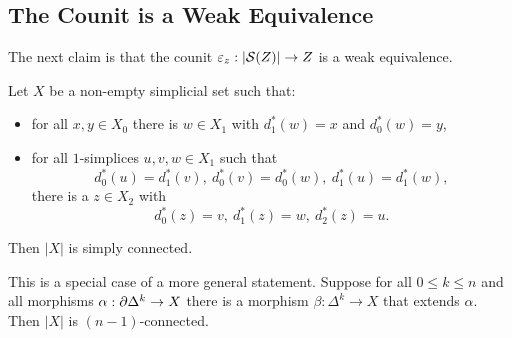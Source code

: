 \subsection{The Counit is a Weak Equivalence}

The next claim is that the counit $\epsilon_z:|\S(Z)|\to Z$ is a weak equivalence.

\begin{proposition}\label{proposition:simply-connected-realization}
Let $X$ be a non-empty simplicial set such that:\rightnote{}
\begin{itemize}[label={-}]
    \item for all $x,y\in X_0$ there is $w\in X_1$ with $d_1^*(w)=x$ and $d_0^*(w)=y$,
    \item for all $1$-simplices $u,v,w\in X_1$ such that
    \[d_0^*(u)=d_1^*(v),\ d_0^*(v)=d_0^*(w),\ d_1^*(u)=d_1^*(w),\]
    there is a $z\in X_2$ with
    \[d_0^*(z)=v,\ d_1^*(z)=w,\ d_2^*(z)=u.\]
\end{itemize}
Then $|X|$ is simply connected.
\end{proposition}

\begin{remark}
This is a special case of a more general statement. Suppose for all $0\le k\le n$ and all morphisms $\alpha:\de\Delta^k\to X$ there is a morphism $\beta:\Delta^k\to X$ that extends $\alpha$. Then $|X|$ is $(n-1)$-connected.
\end{remark}

